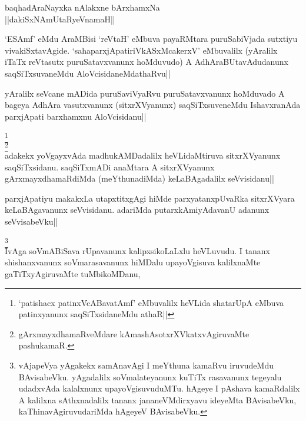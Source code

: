 \stext

\stext

\begin{center}
baqhadAraNayxka nAlakxne bArxhamxNa\\
||dakiSxNAmUtaRyeVnamaH||
\end{center}

\begin{artha}
`ESAmf' eMdu AraMBisi `reVtaH' eMbuva payaRMtara puruSabiVjada 
sutxtiyu vivakiSxtavAgide. `sahaparxjApatiriVkASxMcakerxV' eMbuvalilx 
(yAralilx iTaTx reVtasutx puruSatavxvanunx hoMduvudo) A 
AdhAraBUtavAdudanunx saqSiTxsuvaneMdu AloVcisidaneMdathaRvu||
\end{artha}


\begin{artha}
yAralilx seVcane mADida puruSaviVyaRvu puruSatavxvanunx hoMduvado A 
bageya AdhAra vasutxvanunx (sitxrXVyanunx) saqSiTxsuveneMdu 
IshavxranAda parxjApati barxhamxnu AloVcisidanu||
\end{artha}


\begin{artha}
\footnote[1]{`patishacx patinxVcABavatAmf' eMbuvalilx heVLida 
shatarUpA eMbuva patinxyanunx saqSiTxsidaneMdu athaR||}\\
\footnote[2]{gArxmayxdhamaRveMdare kAmashAsotxrXVkatxvAgiruvaMte 
pashukamaR.}\\
adakekx yoVgayxvAda madhukAMDadalilx heVLidaMtiruva sitxrXVyanunx 
saqSiTxsidanu. saqSiTxmADi anaMtara A sitxrXVyanunx 
gArxmayxdhamaRdiMda (meYthunadiMda) keLaBAgadalilx seVvisidanu||
\end{artha}


\begin{artha}
parxjApatiyu makakxLa utapxtitxgAgi hiMde parxyatanxpUvaRka 
sitxrXVyara keLaBAgavanunx seVvisidanu. adariMda putarxkAmiyAdavanU 
adanunx seVvisabeVku||
\end{artha}


\begin{artha}
\footnote[1]{vAjapeVya yAgakekx samAnavAgi I meYthuna kamaRvu 
iruvudeMdu BAvisabeVku. yAgadalilx soVmalateyanunx kuTiTx rasavanunx 
tegeyalu udadxvAda kalalxnunx upayoVgisuvuduMTu. hAgeye I pAshava 
kamaRdalilx A kalilxna sAthxnadalilx tananx jananeVMdirxyavu ideyeMta 
BAvisabeVku, kaThinavAgiruvudariMda hAgeyeV BAvisabeVku.}\\
IvAga soVmABiSava rUpavanunx kalipxsikoLaLxlu heVLuvudu. I tananx 
shishanxvanunx soVmarasavanunx hiMDalu upayoVgisuva kalilxnaMte 
gaTiTxyAgiruvaMte tuMbikoMDanu,
\end{artha}

